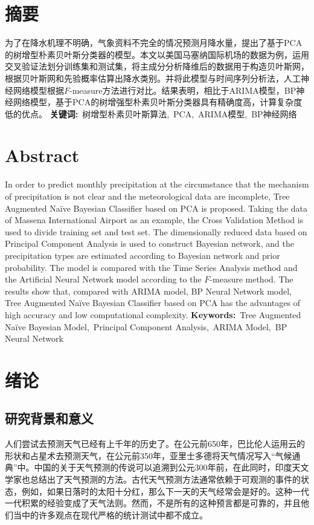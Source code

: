\documentclass{ctexart}
\begin{document}
\thispagestyle{plain}
\section*{摘要}

为了在降水机理不明确，气象资料不完全的情况预测月降水量，提出了基于PCA的树增型朴素贝叶斯分类器的模型。本文以美国马塞纳国际机场的数据为例，运用交叉验证法划分训练集和测试集，将主成分分析降维后的数据用于构造贝叶斯网，根据贝叶斯网和先验概率估算出降水类别。并将此模型与时间序列分析法，人工神经网络模型根据$F$-measure方法进行对比。结果表明，相比于ARIMA模型，BP神经网络模型，基于PCA的树增强型朴素贝叶斯分类器具有精确度高，计算复杂度低的优点。
\newline
\newline
\textbf{关键词:}\ 树增型朴素贝叶斯算法,\ PCA,\ ARIMA模型,\ BP神经网络
\section*{Abstract}
In order to predict monthly precipitation at the circumstance that the mechanism of precipitation is not clear and the meteorological data are incomplete, Tree Augmented Naïve Bayesian Classifier based on PCA is proposed. Taking the data of Massena International Airport as an example, the Cross Validation Method is used to divide training set and test set. The dimensionally reduced data based on Principal Component Analysis is used to construct Bayesian network, and the precipitation types are estimated according to Bayesian network and prior probability. The model is compared with the Time Series Analysis method and the Artificial Neural Network model according to the $F$-measure method. The results show that, compared with ARIMA model, BP Neural Network model, Tree Augmented Naïve Bayesian Classifier based on PCA has the advantages of high accuracy and low computational complexity.
\newline
\newline
\textbf{Keywords:}\ Tree Augmented Naïve Bayesian Model,\ Principal Component Analysis,\ ARIMA Model,\ BP Neural Network
\newpage
\thispagestyle{plain}
\setcounter{page}{1}
\tableofcontents
\newpage
{}
\setcounter{page}{1}
\section{绪论}
\subsection{研究背景和意义}
   人们尝试去预测天气已经有上千年的历史了。在公元前650年，巴比伦人运用云的形状和占星术去预测天气，在公元前350年，亚里士多德将天气情况写入``气候通典''中。中国的关于天气预测的传说可以追溯到公元300年前，在此同时，印度天文学家也总结出了天气预测的方法。古代天气预测方法通常依赖于可观测的事件的状态，例如，如果日落时的太阳十分红，那么下一天的天气经常会是好的。这种一代一代积累的经验变成了天气法则。然而，不是所有的这种预言都是可靠的，并且他们当中的许多观点在现代严格的统计测试中都不成立。
\end{document}
